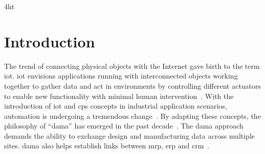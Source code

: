 \documentclass[
a4paper,
twoside,
headsepline,
cleardoublepage=empty,
parskip=half,
draft=false
]{scrbook}
\begin{document}
	
	\listoffigures
	
	
	
	\printnoidxglossaries
	
	\iftex4ht
	\else
	\fi
	
	
	\renewcommand*{\chapterpagestyle}{scrplain}
	\pagestyle{scrheadings}
	\pagestyle{scrheadings}
	\ihead[]{}
	\chead[]{}
	\ohead[]{\headmark}
	\cfoot[]{}
	\ifoot[]{}

	
	\chapter{Introduction} \label{ch:introduction}
		
		The trend of connecting physical objects with the Internet gave birth to the term \gls{iot}. 
		\gls{iot} envisions applications running with interconnected objects working together to gather data and act in environments by controlling different actuators to enable new functionality with minimal human intervention~\cite{atzori2010internet}.
		With the introduction of \gls{iot} and \gls{cps} concepts in industrial application scenarios, automation is undergoing a tremendous change~\cite{wollschlaeger2017future}.
		By adapting these concepts, the philosophy of ``\gls{dama}'' has emerged in the past decade~\cite{heinrichs2005anywhere,venkatesh2005validating,manenti2011building}. 
		The \gls{dama} approach demands the ability to exchange design and manufacturing data across multiple sites. 
		\gls{dama} also helps establish links between \gls{mrp}, \gls{erp} and \gls{crm}~\cite{xu2012cloud}. 
		
\end{document}
